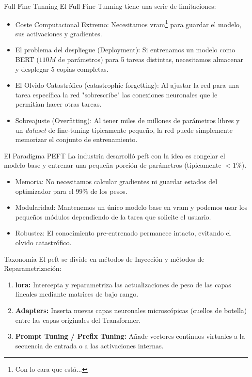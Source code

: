 \begin{frame}{Full Fine-Tunning}
El Full Fine-Tunning tiene una serie de \alert{limitaciones}:
\begin{itemize}
    \item \alert{Coste Computacional Extremo}: Necesitamos \gls{vram}\footnote{Con lo cara que está...} para guardar el modelo, sus activaciones y gradientes.
    \item \alert{El problema del despliegue (Deployment)}: Si entrenamos un modelo como BERT ($110M$ de parámetros) para 5 tareas distintas, necesitamos almacenar y desplegar 5 copias completas.
    \item \alert{El Olvido Catastrófico (catastrophic forgetting):} Al ajustar la red para una tarea específica la red "sobrescribe" las conexiones neuronales que le permitían hacer otras tareas.
    \item \alert{Sobreajuste (Overfitting):} Al tener miles de millones de parámetros libres y un \textit{dataset} de fine-tuning típicamente pequeño, la red puede simplemente memorizar el conjunto de entrenamiento.
\end{itemize}
\end{frame}

\begin{frame}{El Paradigma PEFT}
La industria desarrolló \alert{\gls{peft}} con la idea es congelar el modelo base y entrenar una pequeña \alert{porción de parámetros} (típicamente $<1\%$).

\begin{itemize}
    \item \alert{Memoria:} No necesitamos calcular gradientes ni guardar estados del optimizador para el $99\%$ de los pesos.
    \item \alert{Modularidad:} Mantenemos un único modelo base en \gls{vram} y podemos usar los pequeños módulos dependiendo de la tarea que solicite el usuario.
    \item \alert{Robustez:} El conocimiento pre-entrenado permanece intacto, evitando el olvido catastrófico.
\end{itemize}
\end{frame}

\begin{frame}{Taxonomía}
El \gls{peft} se divide en métodos de \alert{Inyección} y métodos de \alert{Reparametrización}:

\begin{enumerate}
    \item \textbf{\gls{lora}:} Intercepta y reparametriza las actualizaciones de peso de las capas lineales mediante matrices de bajo rango.
    \item \textbf{Adapters:} Inserta nuevas capas neuronales microscópicas (cuellos de botella) entre las capas originales del Transformer.
    \item \textbf{Prompt Tuning / Prefix Tuning:} Añade vectores continuos virtuales a la secuencia de entrada o a las activaciones internas.
\end{enumerate}
\end{frame}

